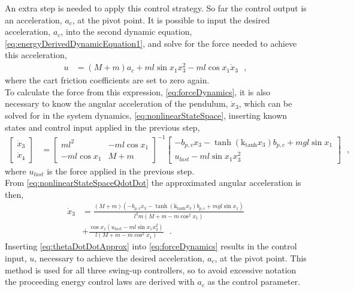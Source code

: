 An extra step is needed to apply this control strategy. So far the control output is an acceleration, $a_c$, at the pivot point. It is possible to input the desired acceleration, $a_c$, into the second dynamic equation, \autoref{eq:energyDerivedDynamicEquation1}, and solve for the force needed to achieve this acceleration,
%
\begin{align}
  u &=  ( M + m )a_c + m l \sin x_1 x_3^2 - m l \cos x_1 \dot{x}_3  \ \ \ ,
  \label{eq:forceDynamics}
\end{align}
%
where the cart friction coefficients are set to zero again.\\
To calculate the force from this expression, \autoref{eq:forceDynamics}, it is also necessary to know the angular acceleration of the pendulum, $\dot{x}_3$, which can be solved for in the system dynamics, \autoref{eq:nonlinearStateSpace}, inserting known states and control input applied in the previous step,
%
\begin{align}
  \begin{bmatrix}
    \dot{x}_3  \\
    \dot{x}_4
  \end{bmatrix}
  &=
  \begin{bmatrix}
    m l^2           & -m l \cos x_1  \\
    -m l \cos x_1   & M + m
  \end{bmatrix}^{-1}
  \begin{bmatrix}
    - b_{p,v} x_3 - \tanh(\text{k}_\text{tanh}x_3) b_{p,c} + m g l \sin x_1 \\
    u_{last} - m l \sin x_1 x_3^2
  \end{bmatrix}
   \ \ \ ,
  \label{eq:nonlinearStateSpaceQdotDot}
\end{align}
%
where $u_{last}$ is the force applied in the previous step.\\
From \autoref{eq:nonlinearStateSpaceQdotDot} the approximated angular acceleration is then,
\begin{align}
  \dot{x}_3 &= \frac{ ( M + m )(- b_{p,v} x_3 - \tanh(\text{k}_\text{tanh}x_3) b_{p,c} + m g l \sin x_1) }{ l^2 m ( M + m - m \cos^2 x_1 ) } \nonumber \\
            &+ \frac{ \cos x_1 (u_{last} - m l \sin x_1 x_3^2) }{ l ( M + m - m \cos^2 x_1 ) }
  \ \ \ . 
  \label{eq:thetaDotDotApprox}
\end{align}
%
Inserting \autoref{eq:thetaDotDotApprox} into \autoref{eq:forceDynamics} results in the control input, $u$, necessary to achieve the desired acceleration, $a_c$, at the pivot point. This method is used for all three swing-up controllers, so to avoid excessive notation the proceeding energy control laws are derived with $a_c$ as the control parameter.

